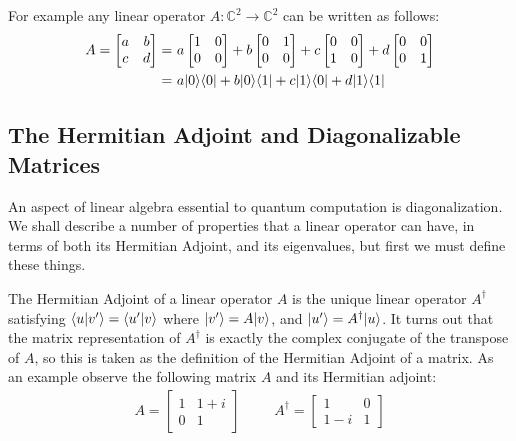 For example any linear operator $A: \mathbb{C}^2 \to \mathbb{C}^2$ can be written as follows:
\begin{align*}
	A = \left[\begin{matrix}
		a&b\\
		c&d
	\end{matrix}\right]
	=&\ 
	a\left[\begin{matrix}
		1&0\\
		0&0
	\end{matrix}\right]
	+
	b\left[\begin{matrix}
		0&1\\
		0&0
	\end{matrix}\right]
	+
	c\left[\begin{matrix}
		0&0\\
		1&0
	\end{matrix}\right]
	+
	d\left[\begin{matrix}
		0&0\\
		0&1
	\end{matrix}\right]
	\\=&\  a\ket{0}\bra{0}+b\ket{0}\bra{1}+c\ket{1}\bra{0}+d\ket{1}\bra{1}
\end{align*}
\subsection{The Hermitian Adjoint and Diagonalizable Matrices}
An aspect of linear algebra essential to quantum computation is diagonalization. We shall describe a number of properties that a linear operator can have, in terms of both its Hermitian Adjoint, and its eigenvalues, but first we must define these things.

The Hermitian Adjoint of a linear operator $A$ is the unique linear operator $A^\dagger$ satisfying $\langle u | v' \rangle = \langle u' | v \rangle$ where $| v' \rangle = A| v \rangle$, and $| u' \rangle = A^\dagger | u \rangle$. It turns out that the matrix representation of $A^\dagger$ is exactly the complex conjugate of the transpose of $A$, so this is taken as the definition of the Hermitian Adjoint of a matrix. As an example observe the following matrix $A$ and its Hermitian adjoint:
\begin{align*}
	A = \left[\begin{matrix}
		1 & 1+i\\
		0 & 1
	\end{matrix}\right]
	&&&
	A^\dagger = \left[\begin{matrix}
		1 & 0\\
		1-i & 1
	\end{matrix}\right]
\end{align*}

